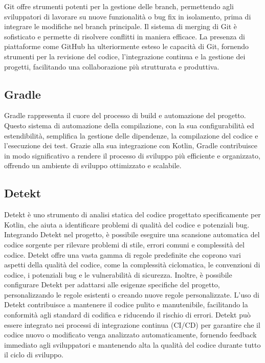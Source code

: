 \documentclass[12pt,a4paper,openright,twoside]{book}
\begin{document}
Git offre strumenti potenti per la gestione delle branch, permettendo agli sviluppatori di lavorare su nuove funzionalità o bug fix in isolamento, prima di integrare 
le modifiche nel branch principale. Il sistema di merging di Git è sofisticato e permette di risolvere conflitti in maniera efficace. La presenza di piattaforme come GitHub 
ha ulteriormente esteso le capacità di Git, fornendo strumenti per la revisione del codice, l'integrazione continua e la gestione dei progetti, facilitando una collaborazione 
più strutturata e produttiva.

\subsection{Gradle}

Gradle rappresenta il cuore del processo di build e automazione del progetto. Questo sistema di automazione della compilazione, con la sua configurabilità ed estendibilità, 
semplifica la gestione delle dipendenze, la compilazione del codice e l'esecuzione dei test. Grazie alla sua integrazione con Kotlin, Gradle contribuisce in modo significativo 
a rendere il processo di sviluppo più efficiente e organizzato, offrendo un ambiente di sviluppo ottimizzato e scalabile.

\subsection{Detekt}
Detekt è uno strumento di analisi statica del codice progettato specificamente per Kotlin, che aiuta a identificare problemi di qualità del codice e potenziali bug. 
Integrando Detekt nel progetto, è possibile eseguire una scansione automatica del codice sorgente per rilevare problemi di stile, errori comuni e complessità del codice.
Detekt offre una vasta gamma di regole predefinite che coprono vari aspetti della qualità del codice, come la complessità ciclomatica, le convenzioni di codice, i potenziali 
bug e le vulnerabilità di sicurezza. Inoltre, è possibile configurare Detekt per adattarsi alle esigenze specifiche del progetto, personalizzando le regole esistenti o creando 
nuove regole personalizzate.
L'uso di Detekt contribuisce a mantenere il codice pulito e manutenibile, facilitando la conformità agli standard di codifica e riducendo il rischio di errori. 
Detekt può essere integrato nei processi di integrazione continua (\ac{CI/CD}) per garantire che il codice nuovo o modificato venga analizzato automaticamente, fornendo feedback 
immediato agli sviluppatori e mantenendo alta la qualità del codice durante tutto il ciclo di sviluppo.
\end{document}
